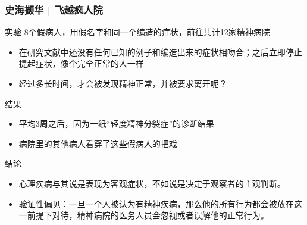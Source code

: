 \begin{frame}
  \frametitle{史海撷华 | 飞越疯人院}
  \vspace{-0.7em}
  \begin{block}{实验}
    8个假病人，用假名字和同一个编造的症状，前往共计12家精神病院
    \begin{itemize}
      \item 在研究文献中还没有任何已知的例子和编造出来的症状相吻合；之后立即停止提起症状，像个完全正常的人一样
      \item 经过多长时间，才会被发现精神正常，并被要求离开呢？
    \end{itemize}
  \end{block}
  \vspace{-0.7em}
  \pause
  \begin{block}{结果}
    \begin{itemize}
      \item 平均3周之后，因为一纸“轻度精神分裂症”的诊断结果
      \item 病院里的其他病人看穿了这些假病人的把戏
    \end{itemize}
  \end{block}
  \vspace{-0.7em}
  \pause
  \begin{block}{结论}
    \begin{itemize}
      \item 心理疾病与其说是表现为客观症状，不如说是决定于观察者的主观判断。
      \item 验证性偏见：一旦一个人被认为有精神疾病，那么他的所有行为都会被放在这一前提下对待，精神病院的医务人员会忽视或者误解他的正常行为。
    \end{itemize}
  \end{block}
\end{frame}

